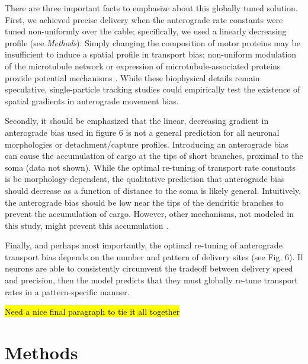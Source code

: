 \documentclass[11pt]{wlpeerj}
\begin{document}
There are three important facts to emphasize about this globally tuned solution. First, we achieved precise delivery when the anterograde rate constants were tuned non-uniformly over the cable; specifically, we used a linearly decreasing profile (see \textit{Methods}). Simply changing the composition of motor proteins \citep{Amrute2012} may be insufficient to induce a spatial profile in transport bias; non-uniform modulation of the microtubule network or expression of microtubule-associated proteins provide potential mechanisms \citep{Kwan2008,Soundararajan_2014}. While these biophysical details remain speculative, single-particle tracking studies could empirically test the existence of spatial gradients in anterograde movement bias.

Secondly, it should be emphasized that the linear, decreasing gradient in anterograde bias used in figure 6 is not a general prediction for all neuronal morphologies or detachment/capture profiles. Introducing an anterograde bias can cause the accumulation of cargo at the tips of short branches, proximal to the soma (data not shown). While the optimal re-tuning of transport rate constants is be morphology-dependent, the qualitative prediction that anterograde bias should decrease as a function of distance to the soma is likely general. Intuitively, the anterograde bias should be low near the tips of the dendritic branches to prevent the accumulation of cargo. However, other mechanisms, not modeled in this study, might prevent this accumulation \citep{Soundararajan_2014}.

Finally, and perhaps most importantly, the optimal re-tuning of anterograde transport bias depends on the number and pattern of delivery sites (see Fig. 6). If neurons are able to consistently circumvent the tradeoff between delivery speed and precision, then the model predicts that they must globally re-tune transport rates in a pattern-specific manner.

\hl{Need a nice final paragraph to tie it all together}

\section*{Methods}
\end{document}
